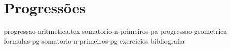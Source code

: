 \chapter{Progressões}
{
    \newcommand{\chapterdir}{./sections/}

    {progressao-aritmetica.tex}
    {somatorio-n-primeiros-pa}
    {progressao-geometrica}
    {formulas-pg}
    {somatorio-n-primeiros-pg}
    {exercicios}
    {bibliografia}
}